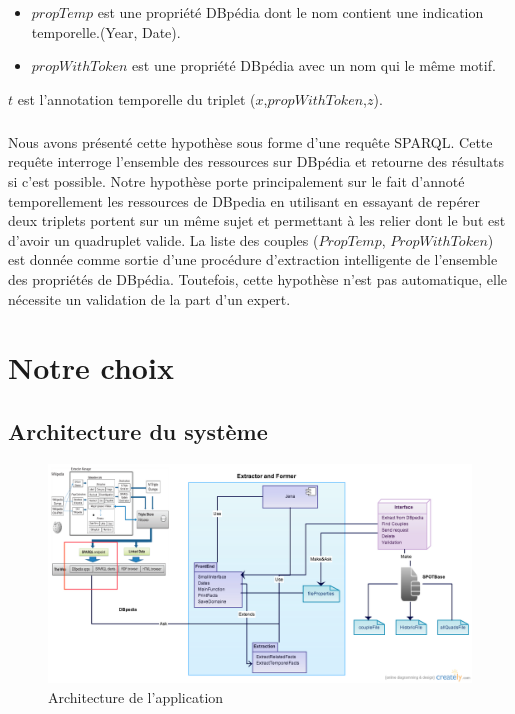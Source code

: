 \begin{itemize}
\item $propTemp$ est une propriété DBpédia dont le nom contient une indication temporelle.(Year, Date).
\item $propWithToken$ est une propriété DBpédia avec un nom qui le même motif.
\end{itemize}
$t$ est l'annotation temporelle du triplet ($x$,$propWithToken$,$z$).

\subparagraph{}
Nous avons présenté cette hypothèse sous forme d'une requête SPARQL. Cette requête interroge l'ensemble des ressources sur DBpédia et retourne des résultats si c'est possible.
Notre hypothèse porte principalement sur le fait d'annoté temporellement les ressources de DBpedia en utilisant en essayant de repérer deux triplets portent sur un même sujet et permettant à les relier dont le but est d'avoir un quadruplet valide. La liste des couples ($PropTemp$, $PropWithToken$)
est donnée comme sortie d'une procédure d'extraction intelligente de l'ensemble des propriétés de DBpédia. Toutefois, cette hypothèse n'est pas automatique, elle nécessite un validation de la part d'un expert.
\newpage
\section{Notre choix}
\subsection{Architecture du système}
 \begin{figure}[H]
        \centering
                \includegraphics[width=16cm]{NEWArchitecture.png}
               \caption{Architecture de l'application}
\end{figure}
